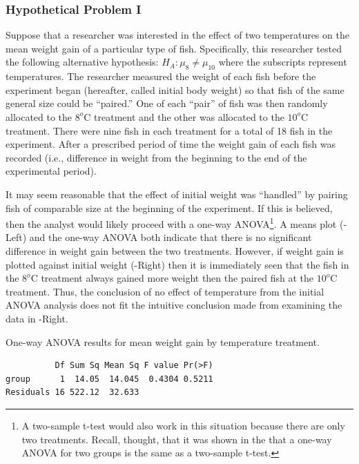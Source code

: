 \documentclass[10pt,openany]{book}\usepackage[]{graphicx}\usepackage[]{color}
\makeatletter
\newenvironment{kframe}{%
 \def\at@end@of@kframe{}%
 \ifinner\ifhmode%
  \def\at@end@of@kframe{\end{minipage}}%
  \begin{minipage}{\columnwidth}%
 \fi\fi%
 \def\FrameCommand##1{\hskip\@totalleftmargin \hskip-\fboxsep
 \colorbox{shadecolor}{##1}\hskip-\fboxsep
     \hskip-\linewidth \hskip-\@totalleftmargin \hskip\columnwidth}%
 \MakeFramed {\advance\hsize-\width
   \@totalleftmargin\z@ \linewidth\hsize
   \@setminipage}}%
 {\par\unskip\endMakeFramed%
 \at@end@of@kframe}
\newenvironment{knitrout}{}{} %
\makeatother
\begin{document}
\subsubsection*{Hypothetical Problem I}
Suppose that a researcher was interested in the effect of two temperatures on the mean weight gain of a particular type of fish.  Specifically, this researcher tested the following alternative hypothesis: $H_{A}: \mu_{8}\neq\mu_{10}$ where the subscripts represent temperatures.  The researcher measured the weight of each fish before the experiment began (hereafter, called initial body weight) so that fish of the same general size could be ``paired.''  One of each ``pair'' of fish was then randomly allocated to the $8^{o}$C treatment and the other was allocated to the $10^{o}$C treatment.  There were nine fish in each treatment for a total of 18 fish in the experiment.  After a prescribed period of time the weight gain of each fish was recorded (i.e., difference in weight from the beginning to the end of the experimental period).

It may seem reasonable that the effect of initial weight was ``handled'' by pairing fish of comparable size at the beginning of the experiment.  If this is believed, then the analyst would likely proceed with a one-way ANOVA\footnote{A two-sample t-test would also work in this situation because there are only two treatments.  Recall, thought, that it was shown in the  that a one-way ANOVA for two groups is the same as a two-sample t-test.}.  A means plot (-Left) and the one-way ANOVA  both indicate that there is no significant difference in weight gain between the two treatments.  However, if weight gain is plotted against initial weight (-Right) then it is immediately seen that the fish in the $8^{o}$C treatment always gained more weight then the paired fish at the $10^{o}$C treatment.  Thus, the conclusion of no effect of temperature from the initial ANOVA analysis does not fit the intuitive conclusion made from examining the data in -Right.

\begin{table}[h]
  \centering
  \caption{One-way ANOVA results for mean weight gain by temperature treatment.}\label{tab:IVRANCOVAEx1Res1}
\begin{knitrout}
\color{fgcolor}\begin{kframe}
\begin{verbatim}
          Df Sum Sq Mean Sq F value Pr(>F)
group      1  14.05  14.045  0.4304 0.5211
Residuals 16 522.12  32.633               
\end{verbatim}
\end{kframe}
\end{knitrout}
\end{table}
\end{document}
